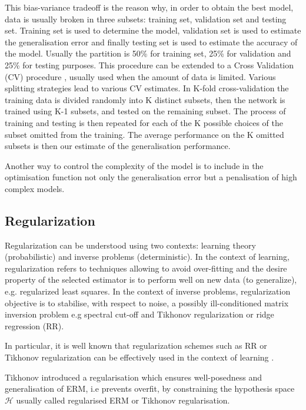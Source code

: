 This bias-variance tradeoff is the reason why, in order to obtain the best model,
data is usually broken in three subsets: training set, validation set and
testing set. Training set is used to determine the model, validation set is used
to estimate the generalisation error and finally testing set is used to estimate
the accuracy of the model. Usually the partition is 50\% for training set, 25\%
for validation and 25\% for testing purposes. This procedure can be extended to
a Cross Validation (CV) procedure \cite{geisser1975}, usually used when the
amount of data is limited. Various splitting strategies lead to various CV
estimates. In K-fold cross-validation the training data is divided randomly into
K distinct subsets, then the network is trained using K-1 subsets, and tested on
the remaining subset. The process of training and testing is then repeated for
each of the K possible choices of the subset omitted from the training. The
average performance on the K omitted subsets is then our estimate of the
generalisation performance.


Another way to control the complexity of the model is to include in the
optimisation function not only the generalisation error but a penalisation of
high complex models. 


\subsection{Regularization}\label{sec:regularization}

Regularization can be understood using two contexts: learning theory
(probabilistic) and inverse problems (deterministic). In the context of
learning, regularization refers to techniques allowing to avoid over-fitting and
the desire property of the selected estimator is to perform well on new data (to
generalize), e.g. regularized least squares. In the context of inverse problems,
regularization objective is to stabilise, with respect to noise, a possibly
ill-conditioned matrix inversion problem e.g spectral cut-off and Tikhonov
regularization or ridge regression (RR)\cite{ tikhonov1977}.

In particular, it is well known that regularization schemes such as RR or
Tikhonov regularization can be effectively used in the context of learning
\cite{vito2005}.

Tikhonov introduced a regularisation which ensures well-posedness and
generalisation of ERM, i.e prevents overfit, by constraining the hypothesis
space $\mathcal{H}$ usually called regularised ERM or Tikhonov regularisation.

